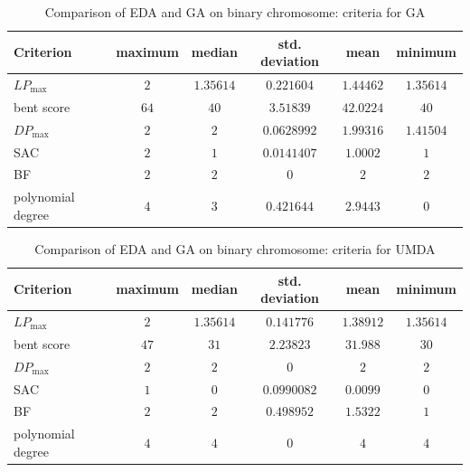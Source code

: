 \begin{table}[tb]
\begin{center}
\begin{tabular}{| l | c | c | c | c | c |}
\hline
Criterion & maximum & median & std. deviation & mean & minimum \\ \hline
$LP_{\max}$ & $2$ & $1.35614$ & $0.221604$ & $1.44462$ & $1.35614$ \\ \hline
bent score & $64$ & $40$ & $3.51839$ & $42.0224$ & $40$ \\ \hline
$DP_{\max}$ & $2$ & $2$ & $0.0628992$ & $1.99316$ & $1.41504$ \\ \hline
SAC & $2$ & $1$ & $0.0141407$ & $1.0002$ & $1$ \\ \hline
BF & $2$ & $2$ & $0$ & $2$ & $2$ \\ \hline
polynomial degree & $4$ & $3$ & $0.421644$ & $2.9443$ & $0$ \\ \hline
\end{tabular}
\caption{Comparison of EDA and GA on binary chromosome: criteria for GA}
\label{tabGaGaVsEDAComparison}
\end{center}
\end{table}
\nopagebreak
\begin{table}[tb]
\begin{center}
\begin{tabular}{| l | c | c | c | c | c |}
\hline
Criterion & maximum & median & std. deviation & mean & minimum \\ \hline
$LP_{\max}$ & $2$ & $1.35614$ & $0.141776$ & $1.38912$ & $1.35614$ \\ \hline
bent score & $47$ & $31$ & $2.23823$ & $31.988$ & $30$ \\ \hline
$DP_{\max}$ & $2$ & $2$ & $0$ & $2$ & $2$ \\ \hline
SAC & $1$ & $0$ & $0.0990082$ & $0.0099$ & $0$ \\ \hline
BF & $2$ & $2$ & $0.498952$ & $1.5322$ & $1$ \\ \hline
polynomial degree & $4$ & $4$ & $0$ & $4$ & $4$ \\ \hline
\end{tabular}
\caption{Comparison of EDA and GA on binary chromosome: criteria for UMDA}
\label{tabUMDAGaVsEDAComparison}
\end{center}
\end{table}
\nopagebreak
